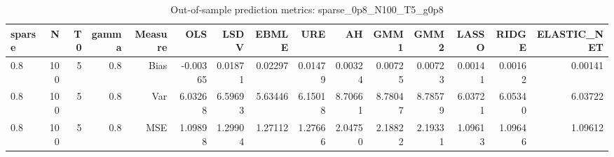 \begin{table}[!htbp]\centering
\caption{Out-of-sample prediction metrics: sparse_0p8_N100_T5_g0p8}
\label{tab:table3_sparse_0p8_N100_T5_g0p8}
\begin{tabular}{lrrrrrrrrrrrrrr}
\hline
sparse & N & T0 & gamma & Measure & OLS & LSDV & EBMLE & URE & AH & GMM1 & GMM2 & LASSO & RIDGE & ELASTIC_NET \\
\hline
0.8 & 100 & 5 & 0.8 & Bias & -0.00365 & 0.01871 & 0.02297 & 0.01479 & 0.00324 & 0.00725 & 0.00723 & 0.00141 & 0.00162 & 0.00141 \\
0.8 & 100 & 5 & 0.8 & Var & 6.03268 & 6.59693 & 5.63446 & 6.15018 & 8.70661 & 8.78047 & 8.78579 & 6.03721 & 6.05340 & 6.03722 \\
0.8 & 100 & 5 & 0.8 & MSE & 1.09898 & 1.29904 & 1.27112 & 1.27666 & 2.04750 & 2.18822 & 2.19331 & 1.09613 & 1.09646 & 1.09612 \\
\hline
\end{tabular}
\end{table}

